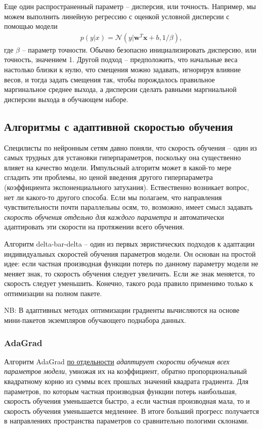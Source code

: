\documentclass[%
	11pt,
	a4paper,
	utf8,
]{article}
\begin{document}
Еще один распространенный параметр -- дисперсия, или точность. Например, мы можем выполнить линейную регрессию с оценкой условной дисперсии с помощью модели
\begin{align*}
	p(y | x) = \mathcal{N}(y | \mathbf{w}^T \mathbf{x} + b, 1 / \beta),
\end{align*}
где $ \beta $ -- параметр точности. Обычно безопасно инициализировать дисперсию, или точность, значением 1. Другой подход -- предположить, что начальные веса настолько близки к нулю, что смещения можно задавать, игнорируя влияние весов, и тогда задать смещения так, чтобы порождалось правильное маргинальное среднее выхода, а дисперсии сделать равными маргниальной дисперсии выхода в обучающем наборе.

\subsection{Алгоритмы с адаптивной скоростью обучения}

Специлисты по нейронным сетям давно поняли, что скорость обучения -- один из самых трудных для установки гиперпараметров, поскольку она существенно влияет на качество модели. Импульсный алгоритм может в какой-то мере сгладить эти проблемы, но ценой введения другого гиперпараметра (коэффициента экспоненциального затухания). Ествественно возникает вопрос, нет ли какого-то другого способа. Если мы полагаем, что направления чувствительности почти параллельны осям, то, возможно, имеет смысл задавать \emph{скорость обучения отдельно для каждого параметра} и автоматически адаптировать эти скорости на протяжении всего обучения.

Алгоритм delta-bar-delta -- один из первых эвристических подходов к адаптации индивидуальных скоростей обучения параметров модели. Он основан на простой идее: если частная производная функции потерь по данному параметру модели не меняет знак, то скорость обучения следует увеличить. Если же знак меняется, то скорость следует уменьшить. Конечно, такого рода правило применимо только к оптимизации на полном пакете.

NB: В адаптивных методах оптимизации градиенты вычисляются на основе мини-пакетов экземпляров обучающего поднабора данных.

\subsubsection{AdaGrad}

Алгоритм AdaGrad \underline{по отдельности} \emph{адаптирует скорости обучения всех параметров модели}, умножая их на коэффициент, обратно пропорциональный квадратному корню из суммы всех прошлых значений квадрата градиента. Для параметров, по которым частная производная функции потерь наибольшая, скорость обучения уменьшается быстро, а если частная производная мала, то и скорость обучения уменьшается медленнее. В итоге больший прогресс получается в направлениях пространства параметров со сравнительно пологими склонами.
\end{document}
